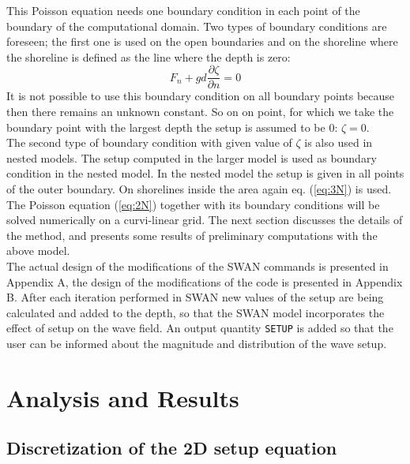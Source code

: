 \documentclass[12pt]{book}
\begin{document}
This Poisson equation needs one boundary condition in each point of the boundary
of the computational domain. Two types of boundary conditions are foreseen; the
first one is used on the open boundaries and on the shoreline where the shoreline
is defined as the line where the depth is zero:
\begin{equation}
F_{n} + gd \frac{\partial \zeta}{\partial n} = 0
\label{eq:3N}
\end{equation}
It is not possible to use this boundary condition on all boundary points because
then there remains an unknown constant. So on on point, for which we take the
boundary point with the largest depth the setup is assumed to be 0:
$\zeta=0$.
\\[2ex]
\noindent
The second type of boundary condition with given value of $\zeta$ is also used in nested
models. The setup computed in the larger model is used as boundary condition in
the nested model. In the nested model the setup  is given in all points of the outer
boundary. On shorelines inside the area again eq. (\ref{eq:3N}) is used.
\\[2ex]
\noindent
The Poisson equation (\ref{eq:2N}) together with its boundary conditions will be solved
numerically on a curvi-linear grid. The next section discusses the details of the
method, and presents some results of preliminary computations with the above
model.
\\[2ex]
\noindent
The actual design of the modifications of the SWAN commands is presented in
Appendix A, the design of the modifications of the code is presented in Appendix
B. After each iteration performed in SWAN new values of the setup are being
calculated and added to the depth, so that the SWAN model incorporates the effect
of setup on the wave field. An output quantity {\tt SETUP} is added so that the user can
be informed about the magnitude and distribution of the wave setup.
\\[2ex]
\noindent
\section{Analysis and Results}
\subsection{Discretization of the 2D setup equation}
\label{sec1G}
%
\end{document}
